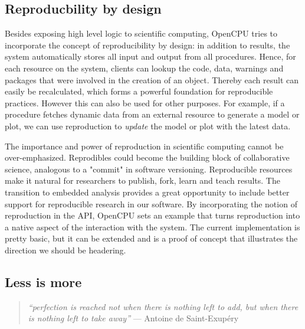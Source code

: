 \documentclass{article}
\begin{document}
\subsection{Reproducbility by design}

Besides exposing high level logic to scientific computing, OpenCPU tries to incorporate the concept of reproducibility by design: in addition to results, the system automatically stores all input and output from all procedures. Hence, for each resource on the system, clients can lookup the code, data, warnings and packages that were involved in the creation of an object. Thereby each result can easily be recalculated, which forms a powerful foundation for reproducible practices. However this can also be used for other purposes. For example, if a procedure fetches dynamic data from an external resource to generate a model or plot, we can use reproduction to \emph{update} the model or plot with the latest data.

The importance and power of reproduction in scientific computing cannot be over-emphasized. Reprodibles could become the building block of collaborative science, analogous to a "commit" in software versioning. Reproducible resources make it natural for researchers to publish, fork, learn and teach results. The transition to embedded analysis provides a great opportunity to include better support for reproducible research in our software. By incorporating the notion of reproduction in the API, OpenCPU sets an example that turns reproduction into a native aspect of the interaction with the system. The current implementation is pretty basic, but it can be extended and is a proof of concept that illustrates the direction we should be headering.  

\subsection{Less is more}

\begin{quote}
\emph{``perfection is reached not when there is nothing left to add, but when there is nothing left to take away''} --- Antoine de Saint-Exupéry
\end{quote}

\vspace{8pt}

\end{document}
